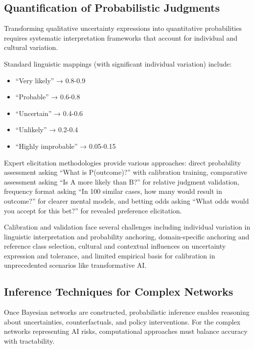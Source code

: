 \documentclass[
  11pt,
  letterpaper,
]{book}
\providecommand{\tightlist}{%
  \setlength{\itemsep}{0pt}\setlength{\parskip}{0pt}}
\begin{document}
\subsection{Quantification of Probabilistic
Judgments}\label{sec-quantification}

Transforming qualitative uncertainty expressions into quantitative
probabilities requires systematic interpretation frameworks that account
for individual and cultural variation.

Standard linguistic mappings (with significant individual variation)
include:

\begin{itemize}
\tightlist
\item
  ``Very likely'' → 0.8-0.9
\item
  ``Probable'' → 0.6-0.8
\item
  ``Uncertain'' → 0.4-0.6
\item
  ``Unlikely'' → 0.2-0.4
\item
  ``Highly improbable'' → 0.05-0.15
\end{itemize}

Expert elicitation methodologies provide various approaches: direct
probability assessment asking ``What is P(outcome)?'' with calibration
training, comparative assessment asking ``Is A more likely than B?'' for
relative judgment validation, frequency format asking ``In 100 similar
cases, how many would result in outcome?'' for clearer mental models,
and betting odds asking ``What odds would you accept for this bet?'' for
revealed preference elicitation.

Calibration and validation face several challenges including individual
variation in linguistic interpretation and probability anchoring,
domain-specific anchoring and reference class selection, cultural and
contextual influences on uncertainty expression and tolerance, and
limited empirical basis for calibration in unprecedented scenarios like
transformative AI.

\subsection{Inference Techniques for Complex
Networks}\label{sec-inference-techniques}

Once Bayesian networks are constructed, probabilistic inference enables
reasoning about uncertainties, counterfactuals, and policy
interventions. For the complex networks representing AI risks,
computational approaches must balance accuracy with tractability.
\end{document}
